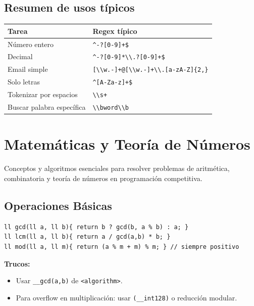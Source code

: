 \documentclass{article}
\begin{document}
\subsection{Resumen de usos típicos}

\begin{center}
\begin{tabular}{ll}
\hline
Tarea & Regex típico \\
\hline
Número entero & \lstinline|^-?[0-9]+$| \\
Decimal & \lstinline|^-?[0-9]*\\.?[0-9]+$| \\
Email simple & \lstinline|[\\w.-]+@[\\w.-]+\\.[a-zA-Z]{2,}| \\
Solo letras & \lstinline|^[A-Za-z]+$| \\
Tokenizar por espacios & \lstinline|\\s+| \\
Buscar palabra específica & \lstinline|\\bword\\b| \\
\hline
\end{tabular}
\end{center}


\section{Matemáticas y Teoría de Números}

Conceptos y algoritmos esenciales para resolver problemas de aritmética, combinatoria y teoría de números en programación competitiva.

\subsection{Operaciones Básicas}

\begin{lstlisting}[style=cppstyle]
ll gcd(ll a, ll b){ return b ? gcd(b, a % b) : a; }
ll lcm(ll a, ll b){ return a / gcd(a,b) * b; }
ll mod(ll a, ll m){ return (a % m + m) % m; } // siempre positivo
\end{lstlisting}

\textbf{Trucos:}
\begin{itemize}
  \item Usar \lstinline|__gcd(a,b)| de \lstinline|<algorithm>|.
  \item Para overflow en multiplicación: usar \lstinline|(__int128)| o reducción modular.
\end{itemize}
\end{document}
